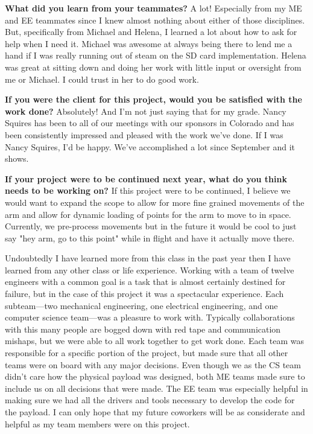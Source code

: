 \textbf{What did you learn from your teammates?}
A lot! Especially from my ME and EE teammates since I knew almost nothing about either of those disciplines. But, specifically from Michael and Helena, I 
learned a lot about how to ask for help when I need it. Michael was awesome at always being there to lend me a hand if I was really running out of steam 
on the SD card implementation. Helena was great at sitting down and doing her work with little input or oversight from me or Michael. I could trust in 
her to do good work.

\textbf{If you were the client for this project, would you be satisfied with the work done?}
Absolutely! And I'm not just saying that for my grade. Nancy Squires has been to all of our meetings with our sponsors in Colorado and has been 
consistently impressed and pleased with the work we've done. If I was Nancy Squires, I'd be happy. We've accomplished a lot since September and it shows.

\textbf{If your project were to be continued next year, what do you think needs to be working on?}
If this project were to be continued, I believe we would want to expand the scope to allow for more fine grained movements of the arm and allow for 
dynamic loading of points for the arm to move to in space. Currently, we pre-process movements but in the future it would be cool to just say "hey arm, 
go to this point" while in flight and have it actually move there.

Undoubtedly I have learned more from this class in the past year then I have learned from any other class or life experience. Working with a team of twelve engineers with a common goal is a task that is almost certainly destined for failure, but in the case of this project it was a spectacular experience. Each subteam—two mechanical engineering, one electrical engineering, and one computer science team—was a pleasure to work with. Typically collaborations with this many people are bogged down with red tape and communication mishaps, but we were able to all work together to get work done. Each team was responsible for a specific portion of the project, but made sure that all other teams were on board with any major decisions. Even though we as the CS team didn't care how the physical payload was designed, both ME teams made sure to include us on all decisions that were made. The EE team was especially helpful in making sure we had all the drivers and tools necessary to develop the code for the payload. I can only hope that my future coworkers will be as considerate and helpful as my team members were on this project.

